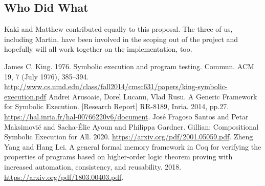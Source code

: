 \documentclass[11pt,conference]{IEEEtran}
\begin{document}
\subsection{Who Did What}

Kaki and Matthew contributed equally to this proposal. The three of us, including Martin, have been involved in the scoping out of the project and hopefully will all work together on the implementation, too. 

\begin{thebibliography}{00}
 James C. King. 1976. Symbolic execution and program testing. Commun. ACM 19, 7 (July 1976), 385–394. \url{http://www.cs.umd.edu/class/fall2014/cmsc631/papers/king-symbolic-execution.pdf}
 Andrei Arusoaie, Dorel Lucanu, Vlad Rusu. A Generic Framework for Symbolic Execution. [Research Report] RR-8189, Inria. 2014, pp.27. \url{https://hal.inria.fr/hal-00766220v6/document}.
 José Fragoso Santos and Petar Maksimović and Sacha-Élie Ayoun and Philippa Gardner. Gillian: Compositional Symbolic Execution for All. 2020. \url{https://arxiv.org/pdf/2001.05059.pdf}.
 Zheng Yang and Hang Lei. A general formal memory framework in Coq for verifying the properties of programs based on higher-order logic theorem proving with increased automation, consistency, and reusability. 2018. \url{https://arxiv.org/pdf/1803.00403.pdf}.
\end{thebibliography} 
\end{document}
